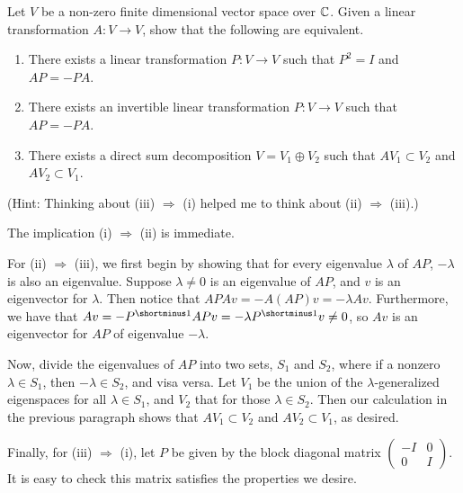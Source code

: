 %
\begin{question}[subtitle=August 2016 Problem 2,ID=Aug16_2]
Let $V$ be a non-zero finite dimensional vector space over $\mathbb{C}$. Given a linear transformation $A\colon V \to V$, show that the following are equivalent.
\renewcommand{\labelenumi}{(\roman{enumi})}
\begin{enumerate}
    \item There exists a linear transformation $P \colon V \to V$ such that $P^2 = I$ and $AP = -PA$.
    \item There exists an invertible linear transformation $P \colon V \to V$ such that $AP = -PA$.
    \item There exists a direct sum decomposition $V = V_1 \oplus V_2$ such that $AV_1 \subset V_2$ and $AV_2 \subset V_1$.
\end{enumerate}
(Hint: Thinking about (iii) $\Rightarrow$ (i) helped me to think about (ii) $\Rightarrow$ (iii).)
\end{question}
\begin{solution}
The implication (i) $\Rightarrow$ (ii) is immediate.

For (ii) $\Rightarrow$ (iii), we first begin by showing that for every eigenvalue $\lambda$ of $AP$, $-\lambda$ is also an eigenvalue. Suppose $\lambda \neq 0$ is an eigenvalue of $AP$, and $v$ is an eigenvector for $\lambda$. Then notice that $APAv = -A(AP)v = -\lambda Av$. Furthermore, we have that $Av = -P\inv APv = -\lambda P\inv v \neq 0$, so $Av$ is an eigenvector for $AP$ of eigenvalue $-\lambda$.

Now, divide the eigenvalues of $AP$ into two sets, $S_1$ and $S_2$, where if a nonzero $\lambda \in S_1$, then $-\lambda \in S_2$, and visa versa. Let $V_1$ be the union of the $\lambda$-generalized eigenspaces for all $\lambda \in S_1$, and $V_2$ that for those $\lambda \in S_2$. Then our calculation in the previous paragraph shows that $AV_1 \subset V_2$ and $AV_2 \subset V_1$, as desired.

Finally, for (iii) $\Rightarrow$ (i), let $P$ be given by the block diagonal matrix $\begin{pmatrix} -I & 0\\0 & I \end{pmatrix}$. It is easy to check this matrix satisfies the properties we desire.
\end{solution}

